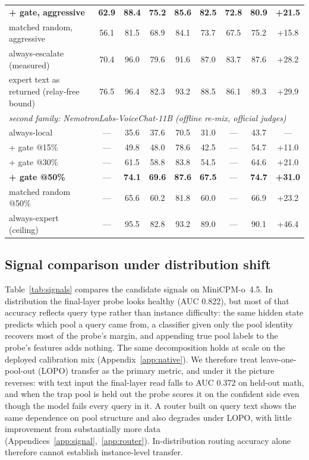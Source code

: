 \begin{table}[t]
\begin{tabular}{lcccccccc}
\;\textbf{+ gate, aggressive} & \textbf{62.9} & \textbf{88.4} & \textbf{75.2} & \textbf{85.6} & \textbf{82.5} & \textbf{72.8} & \textbf{80.9} & \textbf{+21.5} \\
\;matched random, aggressive & 56.1 & 81.5 & 68.9 & 84.1 & 73.7 & 67.5 & 75.2 & +15.8 \\
always-escalate (measured) & 70.4 & 96.0 & 79.6 & 91.6 & 87.0 & 83.7 & 87.6 & +28.2 \\
expert text as returned (relay-free bound) & 76.5 & 96.4 & 82.3 & 93.2 & 88.5 & 86.1 & 89.3 & +29.9 \\
\midrule
\multicolumn{9}{l}{\emph{second family: NemotronLabs-VoiceChat-11B (offline re-mix, official judges)}} \\
always-local          & --- & 35.6 & 37.6 & 70.5 & 31.0 & --- & 43.7 & --- \\
\;+ gate @15\%        & --- & 49.8 & 48.0 & 78.6 & 42.5 & --- & 54.7 & +11.0 \\
\;+ gate @30\%        & --- & 61.5 & 58.8 & 83.8 & 54.5 & --- & 64.6 & +21.0 \\
\;\textbf{+ gate @50\%} & --- & \textbf{74.1} & \textbf{69.6} & \textbf{87.6} & \textbf{67.5} & --- & \textbf{74.7} & \textbf{+31.0} \\
\;matched random @50\% & --- & 65.6 & 60.2 & 81.8 & 60.0 & --- & 66.9 & +23.2 \\
always-expert (ceiling) & --- & 95.5 & 82.8 & 93.2 & 89.0 & --- & 90.1 & +46.4 \\
\bottomrule
\end{tabular}
\end{table}

\subsection{Signal comparison under distribution shift}
\label{sec:audit}

Table~\ref{tab:signals} compares the candidate signals on
MiniCPM-o~4.5. In distribution the final-layer probe looks healthy
(AUC 0.822), but most of that accuracy reflects query type rather
than instance difficulty: the same hidden state predicts which pool a
query came from, a classifier given only the pool identity recovers
most of the probe's margin, and appending true pool labels to the
probe's features adds nothing. The same decomposition holds at scale
on the deployed calibration mix (Appendix~\ref{app:native}). We
therefore treat leave-one-pool-out (LOPO) transfer as the primary
metric, and under it the picture reverses: with text input the
final-layer read falls to AUC 0.372 on held-out math, and when the
trap pool is held out the probe scores it on the confident side even
though the model fails every query in it. A router built on query
text shows the same dependence on pool structure and also degrades
under LOPO, with little improvement from substantially more data
(Appendices~\ref{app:signal},~\ref{app:router}). In-distribution
routing accuracy alone therefore cannot establish instance-level
transfer.

